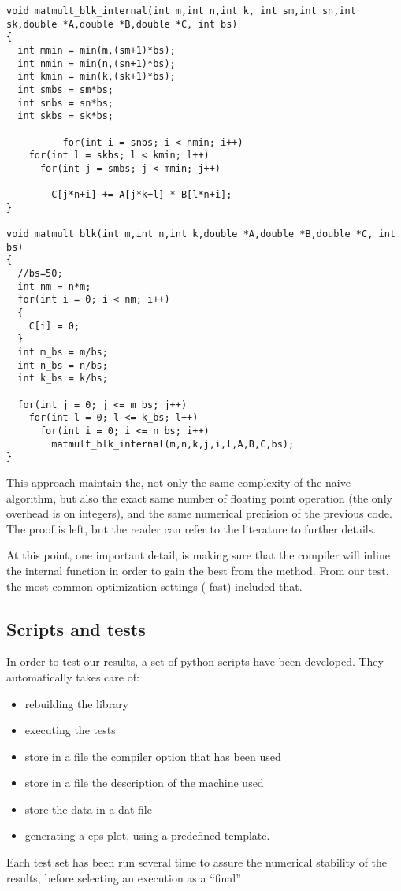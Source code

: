 \begin{lstlisting}
void matmult_blk_internal(int m,int n,int k, int sm,int sn,int sk,double *A,double *B,double *C, int bs)
{
  int mmin = min(m,(sm+1)*bs);
  int nmin = min(n,(sn+1)*bs);
  int kmin = min(k,(sk+1)*bs);
  int smbs = sm*bs;
  int snbs = sn*bs;
  int skbs = sk*bs;

		  for(int i = snbs; i < nmin; i++)
    for(int l = skbs; l < kmin; l++)
      for(int j = smbs; j < mmin; j++)
  
        C[j*n+i] += A[j*k+l] * B[l*n+i];
}

void matmult_blk(int m,int n,int k,double *A,double *B,double *C, int bs)
{
  //bs=50;
  int nm = n*m;
  for(int i = 0; i < nm; i++)  
  {
    C[i] = 0;
  }
  int m_bs = m/bs;
  int n_bs = n/bs;
  int k_bs = k/bs;

  for(int j = 0; j <= m_bs; j++)
    for(int l = 0; l <= k_bs; l++)
      for(int i = 0; i <= n_bs; i++)    
        matmult_blk_internal(m,n,k,j,i,l,A,B,C,bs);
}
\end{lstlisting}

This approach maintain the, not only the same complexity of the naive algorithm, but also the exact same number of floating point operation (the only overhead is on integers), and the same numerical precision of the previous code. The proof is left, but the reader can refer to the literature to further details.

At this point, one important detail, is making sure that the compiler will inline the internal function in order to gain the best from the method. From our test, the most common optimization settings (-fast) included that. 



\subsection{Scripts and tests}

In order to test our results, a set of python scripts have been developed.
They automatically takes care of:
\begin{itemize}
\item rebuilding the library
\item executing the tests
\item store in a file the compiler option that has been used
\item store in a file the description of the machine used
\item store the data in a dat file
\item generating a eps plot, using a predefined template.
\end{itemize}

Each test set has been run several time to assure the numerical stability of the results, before selecting an execution as a “final”
